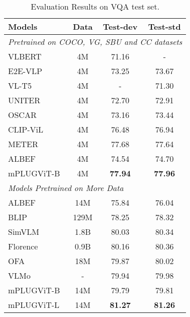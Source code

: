\documentclass[11pt]{article}
\begin{document}
\begin{table}[t]
\setlength\tabcolsep{3pt}
\centering
\begin{tabular}{lccc}
\toprule
Models & Data & Test-dev & Test-std \\
\midrule
\multicolumn{4}{l}{\emph{Pretrained on COCO, VG, SBU and CC datasets}} \\
VLBERT \cite{lu2019vilbert} & 4M   & 71.16    & -   \\
E2E-VLP \cite{xu2021e2e} & 4M & 73.25  & 73.67 \\
VL-T5 \cite{vlt5} & 4M & - & 71.30 \\
UNITER\cite{chen2020uniter} & 4M     & 72.70    & 72.91   \\
OSCAR\cite{li2020oscar} & 4M  & 73.16   & 73.44   \\
CLIP-ViL\cite{shen2021much} & 4M & 76.48 & 76.94 \\
METER\cite{dou2021empirical} & 4M & 77.68 & 77.64 \\
ALBEF\cite{li2021align} & 4M & 74.54 & 74.70   \\
mPLUG\tiny{ViT-B} & 4M  & \textbf{77.94} & \textbf{77.96} \\

\midrule
\multicolumn{4}{l}{\emph{Models Pretrained on More Data}} \\
ALBEF~\cite{li2021align} & 14M & 75.84 & 76.04 \\
BLIP~\cite{li2022blip} & 129M & 78.25 & 78.32 \\
SimVLM~\cite{wang2021simvlm} & 1.8B  &  80.03 & 80.34 \\
Florence~\cite{yuan2021florence} & 0.9B & 80.16&80.36\\
OFA~\cite{wang2022OFA} & 18M & 79.87 & 80.02 \\
VLMo~\cite{wang2021vlmo} & - & 79.94 & 79.98 \\
mPLUG\tiny{ViT-B} & 14M   & 79.79   & 79.81 \\
mPLUG\tiny{ViT-L} & 14M   & \textbf{81.27}  & \textbf{81.26} \\
\bottomrule
\end{tabular}
\caption{Evaluation Results on VQA test set.}
\label{table:vqa}
\end{table}
\end{document}
